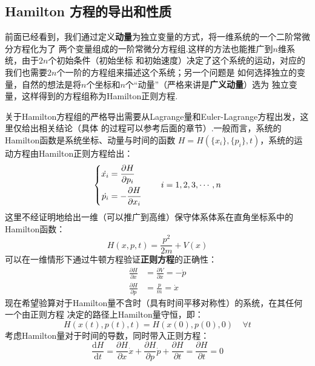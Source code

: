     \subsection{Hamilton 方程的导出和性质}
    前面已经看到，我们通过定义\textbf{动量}为独立变量的方式，将一维系统的一个二阶常微分方程化为了
    两个变量组成的一阶常微分方程组.这样的方法也能推广到$n$维系统，由于$2n$个初始条件（初始坐标
    和初始速度）决定了这个系统的运动，对应的我们也需要$2n$个一阶的方程组来描述这个系统；另一个问题是
    如何选择独立的变量，自然的想法是将$n$个坐标和$n$个“动量”（严格来讲是\textbf{广义动量}）选为
    独立变量，这样得到的方程组称为Hamilton正则方程.
    \par 
    关于Hamilton方程组的严格导出需要从Lagrange量和Euler-Lagrange方程出发，这里仅给出相关结论（具体
    的过程可以参考后面的章节）.一般而言，系统的Hamilton函数是系统坐标、动量与时间的函数
    $H = H(\{x_i\},\{p_i\},t)$，系统的运动方程由Hamilton正则方程给出：
    \begin{equation}
        \left\{
            \begin{split}
                \dot{x_{i}} &= \frac{\partial{H}}{\partial{p_i}}\\
                \dot{p_{i}} &= -\frac{\partial{H}}{\partial{x_{i}}}
            \end{split}
        \right.
        \quad\quad
        i = 1, 2, 3, \cdots, n
        \label{Hamilton equation}
    \end{equation}
    这里不经证明地给出一维（可以推广到高维）保守体系体系在直角坐标系中的Hamilton函数：
    \begin{equation}
        H(x,p,t) = \frac {p^2}{2m} + V(x)
    \end{equation}
    可以在一维情形下通过牛顿方程验证\textbf{正则方程}的正确性：
    \begin{equation}
        \begin{split}
        \frac {\partial H}{\partial x} &= \frac {\partial V}{\partial x} = -\dot{p}\\
        \frac {\partial H}{\partial p} &= \frac pm = \dot{x}
        \end{split}
    \end{equation}
    现在希望验算对于Hamilton量不含时（具有时间平移对称性）的系统，在其任何一个由正则方程
    决定的路径上Hamilton量守恒，即：
    \begin{equation}
        H(x(t),p(t),t) = H(x(0),p(0),0)~~~~~\forall t
    \end{equation}
    考虑Hamilton量对于时间的导数，同时带入正则方程：
    \begin{equation}
        \frac {\mathrm{d}H}{\mathrm{d}t} = \frac {\partial H}{\partial x} \dot{x} + \frac {\partial H}{\partial p} \dot{p} + \frac {\partial H}{\partial t} = \frac {\partial H}{\partial t} = 0
    \end{equation}
